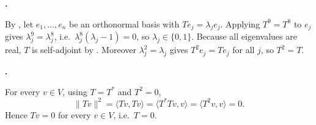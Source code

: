 \documentclass[10pt]{scrartcl}
\begin{document}
\begin{prob}
  \textbf{. }\par
  \begin{steps}
    \ii By , let $e_1,\dots,e_n$ be an orthonormal basis with $Te_j=\lambda_j e_j$.
    \ii Applying $T^9=T^8$ to $e_j$ gives $\lambda_j^9=\lambda_j^8$, i.e.\ $\lambda_j^8(\lambda_j-1)=0$, so $\lambda_j\in\{0,1\}$.
    \ii Because all eigenvalues are real, $T$ is self-adjoint by . Moreover $\lambda_j^2=\lambda_j$ gives $T^2e_j=Te_j$ for all $j$, so $T^2=T$.
  \end{steps}
\end{prob}

\begin{prob}
  \textbf{. }\par
  For every $v\in V$, using $T=T^*$ and $T^2=0$,
  \[
    \|Tv\|^2 = \langle Tv,Tv\rangle = \langle T^*Tv,v\rangle = \langle T^2v,v\rangle = 0.
  \]
  Hence $Tv=0$ for every $v\in V$, i.e.\ $T=0$.
\end{prob}
\end{document}
